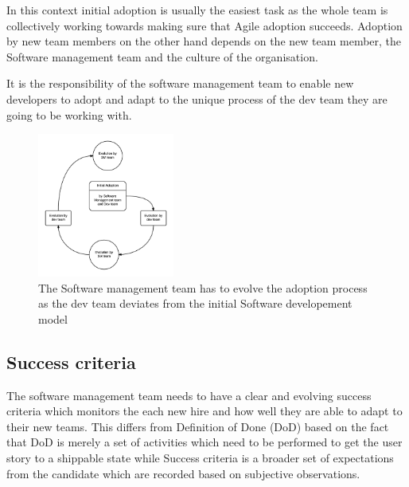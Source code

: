 \documentclass[10pt,conference]{IEEEtran}
\begin{document}
In this context initial adoption is usually the easiest task as the whole team is collectively working towards making sure that Agile adoption succeeds. Adoption by new team members on the other hand depends on the new team member, the Software management team and the culture of the organisation.

It is the responsibility of the software management team to enable new developers to adopt and adapt to the unique process of the dev team they are going to be working with.

\begin{figure}[t]
\centering
\includegraphics[width=0.4\textwidth]{sm_dev_team_process_evolution.png}
\caption{The Software management team has to evolve the adoption process as the dev team deviates from the initial Software developement model}
\end{figure}

\subsection*{Success criteria} The software management team needs to have a clear and evolving success criteria which monitors the each new hire and how well they are able to adapt to their new teams. This differs from Definition of Done (DoD) based on the fact that DoD is merely a set of activities which need to be performed to get the user story to a shippable state while Success criteria is a broader set of expectations from the candidate which are recorded based on subjective observations. 








\end{document}
